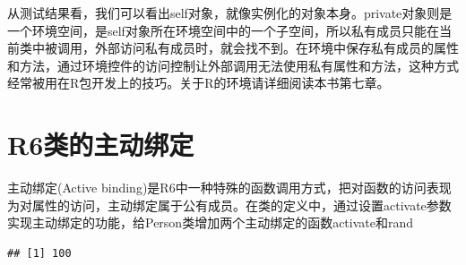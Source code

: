 \documentclass[]{book}
\newenvironment{Shaded}{\begin{snugshade}}{\end{snugshade}}
\newcommand{\KeywordTok}[1]{\textcolor[rgb]{0.13,0.29,0.53}{\textbf{#1}}}
\newcommand{\DataTypeTok}[1]{\textcolor[rgb]{0.13,0.29,0.53}{#1}}
\newcommand{\DecValTok}[1]{\textcolor[rgb]{0.00,0.00,0.81}{#1}}
\newcommand{\StringTok}[1]{\textcolor[rgb]{0.31,0.60,0.02}{#1}}
\newcommand{\CommentTok}[1]{\textcolor[rgb]{0.56,0.35,0.01}{\textit{#1}}}
\newcommand{\ControlFlowTok}[1]{\textcolor[rgb]{0.13,0.29,0.53}{\textbf{#1}}}
\newcommand{\OperatorTok}[1]{\textcolor[rgb]{0.81,0.36,0.00}{\textbf{#1}}}
\newcommand{\NormalTok}[1]{#1}
\begin{document}
从测试结果看，我们可以看出self对象，就像实例化的对象本身。private对象则是一个环境空间，是self对象所在环境空间中的一个子空间，所以私有成员只能在当前类中被调用，外部访问私有成员时，就会找不到。在环境中保存私有成员的属性和方法，通过环境控件的访问控制让外部调用无法使用私有属性和方法，这种方式经常被用在R包开发上的技巧。关于R的环境请详细阅读本书第七章。

\section{R6类的主动绑定}\label{r6}

主动绑定(Active
binding)是R6中一种特殊的函数调用方式，把对函数的访问表现为对属性的访问，主动绑定属于公有成员。在类的定义中，通过设置activate参数实现主动绑定的功能，给Person类增加两个主动绑定的函数activate和rand

\begin{Shaded}
\end{Shaded}

\begin{verbatim}
## [1] 100
\end{verbatim}
\end{document}
